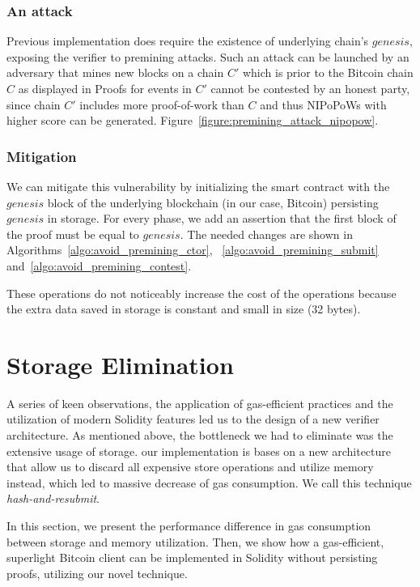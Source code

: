 \subsubsection{An attack} Previous implementation does require the existence of
underlying chain's $genesis$, exposing the verifier to premining attacks. Such
an attack can be launched by an adversary that mines new blocks on a chain $C'$
which is prior to the Bitcoin chain $C$ as displayed in
 Proofs for events in $C'$ cannot
be contested by an honest party, since chain $C'$ includes more proof-of-work
than $C$ and thus NIPoPoWs with higher score can be generated.
Figure~\ref{figure:premining_attack_nipopow}.

\subsubsection{Mitigation}

We can mitigate this vulnerability by initializing the smart contract with the
$genesis$ block of the underlying blockchain (in our case, Bitcoin) persisting
$genesis$ in storage. For every phase, we add an assertion that the first block
of the proof must be equal to $genesis$. The needed changes are shown in
Algorithms~\ref{algo:avoid_premining_ctor}, ~\ref{algo:avoid_premining_submit}
and~\ref{algo:avoid_premining_contest}.

These operations do not noticeably increase the cost of the operations because
the extra data saved in storage is constant and small in size (32 bytes).



\section{Storage Elimination}

A series of keen observations, the application of gas-efficient practices and
the utilization of modern Solidity features led us to the design of a new
verifier architecture. As mentioned above, the bottleneck we had to eliminate
was the extensive usage of storage. our implementation is bases on a new
architecture that allow us to discard all expensive store operations and
utilize memory instead, which led to massive decrease of gas consumption. We
call this technique \emph{hash-and-resubmit}.

In this section, we present the performance difference in gas consumption
between storage and memory utilization. Then, we show how a gas-efficient,
superlight Bitcoin client can be implemented in Solidity without persisting
proofs, utilizing our novel technique.

